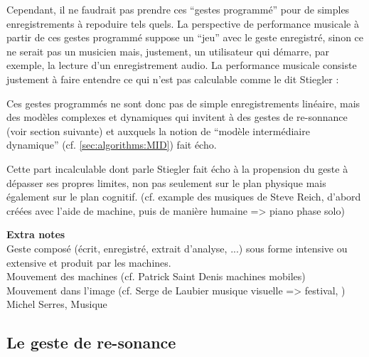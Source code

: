 Cependant, il ne faudrait pas prendre ces ``gestes programmé'' pour de simples enregistrements à repoduire tels quels. La perspective de performance musicale à partir de ces gestes programmé suppose un ``jeu'' avec le geste enregistré, sinon ce ne serait pas un musicien mais, justement, un utilisateur qui démarre, par exemple, la lecture d'un enregistrement audio. La performance musicale consiste justement à faire entendre ce qui n'est pas calculable comme le dit Stiegler \cite{stiegler_circuit_2004}:
 

 Ces gestes programmés ne sont donc pas de simple enregistrements linéaire, mais des modèles complexes et dynamiques qui invitent à des gestes de re-sonnance (voir section suivante) et auxquels la notion de ``modèle intermédiaire dynamique'' (cf. \ref{sec:algorithms:MID}) fait écho.

 Cette part incalculable dont parle Stiegler fait écho à la propension du geste à dépasser ses propres limites, non pas seulement sur le plan physique mais également sur le plan cognitif. (cf. example des musiques de Steve Reich, d'abord créées avec l'aide de machine, puis de manière humaine => piano phase solo)

\textbf{Extra notes}\\

Geste composé (écrit, enregistré, extrait d'analyse, ...) sous forme intensive ou extensive et produit par les machines.\\
Mouvement des machines (cf. Patrick Saint Denis machines mobiles)\\
Mouvement dans l'image (cf. Serge de Laubier musique visuelle => festival, )\\
 Michel Serres, Musique


\subsection{Le geste de re-sonance}

